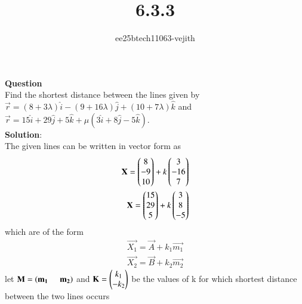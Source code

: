 \documentclass[journal]{IEEEtran}
\begin{document}

\vspace{3cm}

\title{6.3.3}
\author{ee25btech11063-vejith}

\maketitle
{\let\newpage\relax\maketitle}
\renewcommand{\thefigure}{\theenumi}
\renewcommand{\thetable}{\theenumi}
\setlength{\intextsep}{10pt} %
\textbf{Question}\\
Find the shortest distance between the lines given by\\
$\vec{r} = (8 + 3\lambda) \hat{i} - (9 + 16\lambda) \hat{j} + (10 + 7\lambda) \hat{k}$ and \\$ \vec{r} = 15 \hat{i} + 29 \hat{j} + 5 \hat{k} + \mu (3 \hat{i} + 8 \hat{j} - 5 \hat{k}).$\\
\textbf{Solution}:\\
The given lines can be written in vector form as
\begin{align}
    \mathbf{X}=\begin{pmatrix}8\\-9\\10\end{pmatrix}+k\begin{pmatrix}3\\-16\\7\end{pmatrix}\\
    \mathbf{X}=\begin{pmatrix}15\\29\\5\end{pmatrix}+k\begin{pmatrix}3\\8\\-5\end{pmatrix}\\
    \end{align}
which are of the form
\begin{align}
    \vec{X_1}=\vec{A} + k_1\vec{m_1}\\
    \vec{X_2}=\vec{B} + k_2\vec{m_2}
    \end{align}
     let  $\mathbf{M}=\left(\mathbf{m_1}\hspace{0.5cm}\mathbf{m_2}\right)$  and  $\mathbf{K}=\begin{pmatrix}k_1\\-k_2\end{pmatrix}$ be the values of k for which shortest distance between the two lines occurs 
\end{document}
